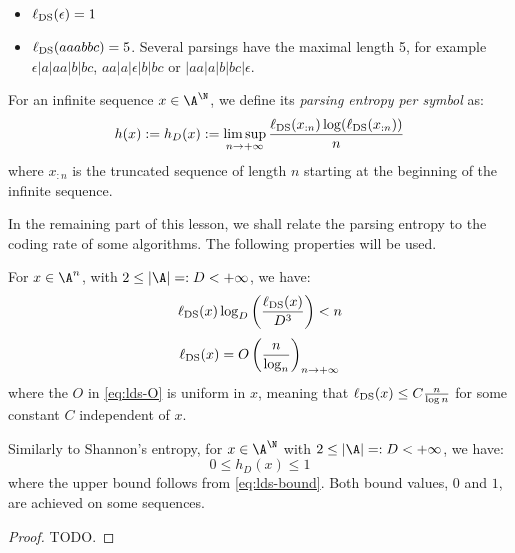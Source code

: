 \documentclass[toc]{../cs-classes/cs-classes}
\newcommand*{\lds}{\ell_{\textnormal{DS}}}
\begin{document}
\begin{example}
    \leavevmode
    \begin{itemize}
        \item $\lds(\epsilon) = 1$
        \item $\lds(aaabbc) = 5$. Several parsings have the maximal length 5, for example $\epsilon|a|aa|b|bc$, $aa|a|\epsilon|b|bc$ or $|aa|a|b|bc|\epsilon$.
    \end{itemize}
\end{example}

\begin{definition}
    For an infinite sequence $x\in\A^\N$, we define its \emph{parsing entropy per symbol} as:
    \begin{equation*}
        h(x):=h_D(x) := \limsup_{n\to+\infty} \frac{\lds(x_{:n}) \log(\lds(x_{:n}))}{n}
    \end{equation*}
    where $x_{:n}$ is the truncated sequence of length $n$ starting at the beginning of the infinite sequence.
\end{definition}
In the remaining part of this lesson, we shall relate the parsing entropy to the coding rate of some algorithms. The following properties will be used.

\begin{lemma}
    For $x\in\A^n$, with $2\leq|\A|=:D<+\infty$, we have:
    \begin{equation}
        \label{eq:lds-bound}
        \lds(x)\log_D\left(\frac{\lds(x)}{D^3}\right) < n
    \end{equation}
    \begin{equation}
        \label{eq:lds-O}
        \lds(x) = O\left(\frac{n}{\log_n}\right)_{n\to+\infty}
    \end{equation}
    where the $O$ in \eqref{eq:lds-O} is uniform in $x$, meaning that $\lds(x) \leq C \frac{n}{\log n}$ for some constant $C$ independent of $x$.
\end{lemma}

\begin{corollary}
    Similarly to Shannon's entropy, for $x\in\A^\N$ with $2\leq|\A|=:D<+\infty$, we have:
    \begin{equation}
        0\leq h_D(x) \leq 1
    \end{equation}
    where the upper bound follows from \eqref{eq:lds-bound}. Both bound values, $0$ and $1$, are achieved on some sequences.
\end{corollary}
\begin{proof}
    TODO.
\end{proof}
\end{document}
